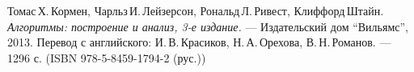  
\begin{thebibliography}{99}
	Томас\,Х.\,Кормен, Чарльз\,И.\,Лейзерсон, Рональд\,Л.\,Ривест, Клиффорд\,Штайн.
	{\itshape Алгоритмы: построение и анализ, 3-е издание.} --- Издательский дом \enquote{Вильямс}, 2013. Перевод с английского: И.\,В.\,Красиков, Н.\,А.\,Орехова, В.\,Н.\,Романов. --- 1296 с. (ISBN 978-5-8459-1794-2 (рус.))
\end{thebibliography}
\pagebreak
